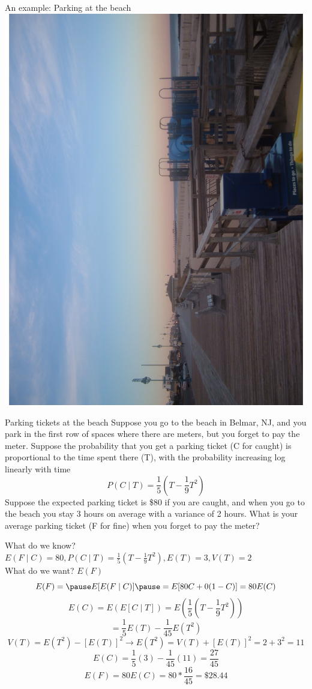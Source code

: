 \documentclass{beamer}
\begin{document}
\begin{frame}{An example: Parking at the beach}
\centering\includegraphics[angle=270,scale=.3]{figures/Belmar.pdf}
\end{frame}

\begin{frame}{Parking tickets at the beach}
Suppose you go to the beach in Belmar, NJ, and you park in the first row of spaces where there are meters, but you forget to pay the meter. Suppose the probability that you get a parking ticket (C for caught) is proportional to the time spent there (T), with the probability increasing log linearly with time
$$P(C \mid T) = \frac{1}{5}\left(T-\frac{1}{9}T^2\right)$$
Suppose the expected parking ticket is \$80 if you are caught, and when you go to the beach you stay 3 hours on average with a variance of 2 hours. What is your average parking ticket (F for fine) when you forget to pay the meter?
\end{frame}

\begin{frame}
\alert{What do we know?} $E(F\mid C)=80, P(C\mid T)=\frac{1}{5}\left(T-\frac{1}{9}T^2\right), E(T)=3, V(T)=2$ \\
\alert{What do we want?} $E(F)$ \\
$$E(F) = \pause E[E(F\mid C)] \pause = E[80C + 0(1-C)] = 80E(C)$$
\pause
$$E(C)=E(E[C\mid T])=E\left(\frac{1}{5}\left (T-\frac{1}{9}T^2\right)\right)$$
\pause
$$=\frac{1}{5}E(T)-\frac{1}{45}E(T^2)$$
\pause
$$V(T)=E(T^2)-[E(T)]^2 \rightarrow E(T^2)=V(T)+[E(T)]^2=2+3^2=11$$
\pause
$$E(C)=\frac{1}{5}(3)-\frac{1}{45}(11)=\frac{27}{45}$$
\pause
$$E(F)=80E(C)=80*\frac{16}{45}=\$28.44$$
\end{frame}
\end{document}
